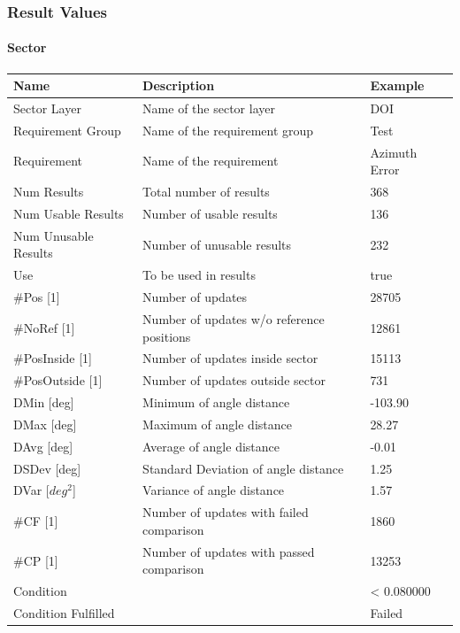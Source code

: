 \subsubsection{Result Values}

\paragraph{Sector}

\begin{center}
 \begin{table}[H]
  \begin{tabularx}{\textwidth}{ | l | X |  l | }
    \hline
    \textbf{Name} & \textbf{Description} & \textbf{Example} \\ \hline
  Sector Layer & Name of the sector layer & DOI  \\ \hline
  Requirement Group & Name of the requirement group & Test  \\ \hline
  Requirement & Name of the requirement & Azimuth Error  \\ \hline
  Num Results & Total number of results & 368  \\ \hline
  Num Usable Results & Number of usable results & 136  \\ \hline
  Num Unusable Results & Number of unusable results & 232  \\ \hline
  Use & To be used in results & true  \\ \hline
  \#Pos [1] & Number of updates & 28705  \\ \hline
  \#NoRef [1] & Number of updates w/o reference positions & 12861  \\ \hline
  \#PosInside [1] & Number of updates inside sector & 15113  \\ \hline
  \#PosOutside [1] & Number of updates outside sector & 731  \\ \hline
  DMin [deg] & Minimum of angle distance & -103.90  \\ \hline
  DMax [deg] & Maximum of angle distance & 28.27  \\ \hline
  DAvg [deg] & Average of angle distance & -0.01  \\ \hline
  DSDev [deg] & Standard Deviation of angle distance & 1.25  \\ \hline
  DVar [$deg^2$] & Variance of angle distance & 1.57  \\ \hline
  \#CF [1] & Number of updates with failed comparison & 1860  \\ \hline
  \#CP [1] & Number of updates with passed comparison  & 13253  \\ \hline
  Condition &  & < 0.080000  \\ \hline
  Condition Fulfilled &  & Failed  \\ \hline
\end{tabularx}
\end{table}
\end{center}

